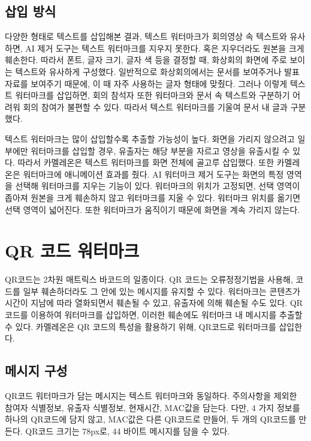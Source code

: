 \subsection*{삽입 방식}

다양한 형태로 텍스트를 삽입해본 결과, 텍스트 워터마크가 회의영상 속 텍스트와
유사하면, AI 제거 도구는 텍스트 워터마크를 지우지 못한다. 혹은 지우더라도 원본을
크게 훼손한다. 따라서 폰트, 글자 크기, 글자 색 등을 결정할 때, 화상회의 화면에
주로 보이는 텍스트와 유사하게 구성했다. 일반적으로 화상회의에서는 문서를
보여주거나 발표자료를 보여주기 때문에, 이 때 자주 사용하는 글자 형태에 맞췄다.
그러나 이렇게 텍스트 워터마크를 삽입하면, 회의 참석자 또한 워터마크와 문서 속
텍스트와 구분하기 어려워 회의 참여가 불편할 수 있다. 따라서 텍스트 워터마크를
기울여 문서 내 글과 구분했다.

텍스트 워터마크는 많이 삽입할수록 추출할 가능성이 높다. 화면을 가리지
않으려고 일부에만 워터마크를 삽입할 경우, 유출자는 해당 부분을 자르고 영상을
유출시킬 수 있다. 따라서 카멜레온은 텍스트 워터마크를 화면 전체에 골고루
삽입했다. 또한 카멜레온은 워터마크에 애니메이션 효과를 줬다. AI 워터마크 제거
도구는 화면의 특정 영역을 선택해 워터마크를 지우는 기능이 있다. 워터마크의
위치가 고정되면, 선택 영역이 좁아져 원본을 크게 훼손하지 않고 워터마크를 지울 수
있다. 워터마크 위치를 옮기면 선택 영역이 넓어진다. 또한 워터마크가 움직이기
때문에 화면을 계속 가리지 않는다. 


\section{QR 코드 워터마크}

QR코드는 2차원 매트릭스 바코드의 일종이다. QR 코드는 오류정정기법을 사용해,
코드를 일부 훼손하더라도 그 안에 있는 메시지를 유지할 수 있다. 워터마크는
콘텐츠가 시간이 지남에 따라 열화되면서 훼손될 수 있고, 유출자에 의해 훼손될 수도
있다. QR 코드를 이용하여 워터마크를 삽입하면, 이러한 훼손에도 워터마크 내
메시지를 추출할 수 있다. 카멜레온은 QR 코드의 특성을 활용하기 위해,
QR코드로 워터마크를 삽입한다.


\subsection*{메시지 구성}


QR코드 워터마크가 담는 메시지는 텍스트 워터마크와 동일하다. 주의사항을
제외한 참여자 식별정보, 유출자 식별정보, 현재시간, MAC값을 담는다. 다만, 4
가지 정보를 하나의 QR코드에 담지 않고, MAC값은 다른 QR코드로 만들어, 두 개의
QR코드를 만든다. QR코드 크기는 78px로, 44 바이트 메시지를 담을 수 있다.


